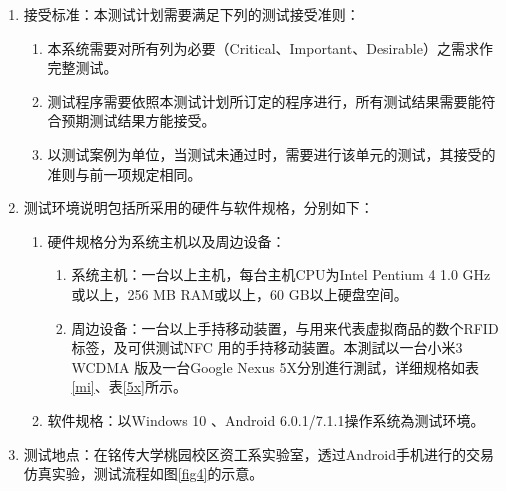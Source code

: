 	 		\begin{enumerate}
	 			
	 			\item 接受标准：本测试计划需要满足下列的测试接受准则： 

	 			\begin{enumerate}
					\item 本系统需要对所有列为必要（Critical、Important、Desirable）之需求作完整测试。
					\item 测试程序需要依照本测试计划所订定的程序进行，所有测试结果需要能符合预期测试结果方能接受。
					\item 以测试案例为单位，当测试未通过时，需要进行该单元的测试，其接受的准则与前一项规定相同。 
				\end{enumerate}

				\item 测试环境说明包括所采用的硬件与软件规格，分别如下：
				\begin{enumerate}
					\item 硬件规格分为系统主机以及周边设备：
					
					\begin{enumerate}
						\item 系统主机：一台以上主机，每台主机CPU为Intel Pentium 4 1.0 GHz或以上，256 MB RAM或以上，60 GB以上硬盘空间。
						\item 周边设备：⼀台以上⼿持移动装置，与⽤来代表虚拟商品的数个RFID标签，及可供测试NFC ⽤的⼿持移动装置。本測試以一台⼩⽶3 WCDMA 版及一台Google Nexus 5X分別進行測試，详细规格如表\ref{mi}、表\ref{5x}所示。
					
					\end{enumerate}
					\item 软件规格：以Windows 10 、Android 6.0.1/7.1.1操作系统為测试环境。

				\end{enumerate}
				\item 测试地点：在铭传大学桃园校区资工系实验室，透过Android手机进行的交易仿真实验，测试流程如图\ref{fig4}的示意。

	 	


\end{enumerate}
